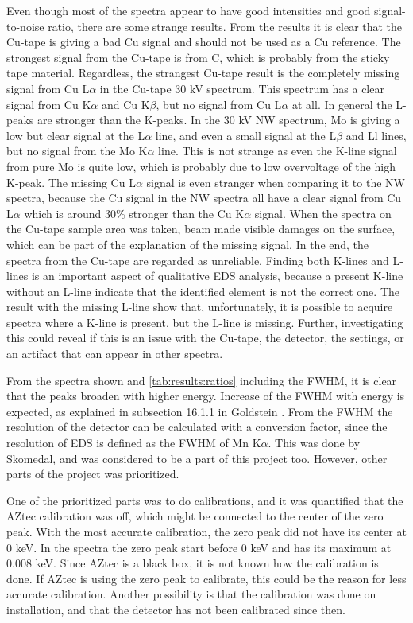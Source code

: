 Even though most of the spectra appear to have good intensities and good signal-to-noise ratio, there are some strange results.
From the results it is clear that the Cu-tape is giving a bad Cu signal and should not be used as a Cu reference.
The strongest signal from the Cu-tape is from C, which is probably from the sticky tape material.
Regardless, the strangest Cu-tape result is the completely missing signal from Cu L$\alpha$ in the Cu-tape 30 kV spectrum.
This spectrum has a clear signal from Cu K$\alpha$ and Cu K$\beta$, but no signal from Cu L$\alpha$ at all.
In general the L-peaks are stronger than the K-peaks.
In the 30 kV NW spectrum, Mo is giving a low but clear signal at the L$\alpha$ line, and even a small signal at the L$\beta$ and Ll lines, but no signal from the Mo K$\alpha$ line.
This is not strange as even the K-line signal from pure Mo is quite low, which is probably due to low overvoltage of the high K-peak.
The missing Cu L$\alpha$ signal is even stranger when comparing it to the NW spectra, because the Cu signal in the NW spectra all have a clear signal from Cu L$\alpha$ which is around 30\% stronger than the Cu K$\alpha$ signal.
When the spectra on the Cu-tape sample area was taken, beam made visible damages on the surface, which can be part of the explanation of the missing signal.
In the end, the spectra from the Cu-tape are regarded as unreliable.
Finding both K-lines and L-lines is an important aspect of qualitative EDS analysis, because a present K-line without an L-line indicate that the identified element is not the correct one.
The result with the missing L-line show that, unfortunately, it is possible to acquire spectra where a K-line is present, but the L-line is missing.
Further, investigating this could reveal if this is an issue with the Cu-tape, the detector, the settings, or an artifact that can appear in other spectra.


From the spectra shown and \cref{tab:results:ratios} including the FWHM, it is clear that the peaks broaden with higher energy.
Increase of the FWHM with energy is expected, as explained in subsection 16.1.1 in Goldstein \cite{goldstein_scanning_2018}.
From the FWHM the resolution of the detector can be calculated with a conversion factor, since the resolution of EDS is defined as the FWHM of Mn K$\alpha$.
This was done by Skomedal, and was considered to be a part of this project too.
However, other parts of the project was prioritized.


One of the prioritized parts was to do calibrations, and it was quantified that the AZtec calibration was off, which might be connected to the center of the zero peak.
With the most accurate calibration, the zero peak did not have its center at 0 keV.
In the spectra the zero peak start before 0 keV and has its maximum at 0.008 keV.
Since AZtec is a black box, it is not known how the calibration is done.
If AZtec is using the zero peak to calibrate, this could be the reason for less accurate calibration.
Another possibility is that the calibration was done on installation, and that the detector has not been calibrated since then.


